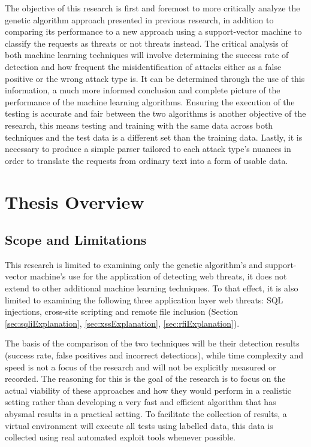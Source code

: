 The objective of this research is first and foremost to more critically analyze the genetic algorithm approach presented in previous research, in addition to comparing its performance to a new approach using a support-vector machine to classify the requests as threats or not threats instead.  The critical analysis of both machine learning techniques will involve determining the success rate of detection and how frequent the misidentification of attacks either as a false positive or the wrong attack type is.  It can be determined through the use of this information, a much more informed conclusion and complete picture of the performance of the machine learning algorithms.  Ensuring the execution of the testing is accurate and fair between the two algorithms is another objective of the research, this means testing and training with the same data across both techniques and the test data is a different set than the training data.  Lastly, it is necessary to produce a simple parser tailored to each attack type's nuances in order to translate the requests from ordinary text into a form of usable data.

\section{Thesis Overview}
\subsection{Scope and Limitations}\label{sec:scope}
This research is limited to examining only the genetic algorithm’s and support-vector machine’s use for the application of detecting web threats, it does not extend to other additional machine learning techniques.  To that effect, it is also limited to examining the following three application layer web threats: SQL injections, cross-site scripting and remote file inclusion (Section \ref{sec:sqliExplanation}, \ref{sec:xssExplanation}, \ref{sec:rfiExplanation}).

The basis of the comparison of the two techniques will be their detection results (success rate, false positives and incorrect detections), while time complexity and speed is not a focus of the research and will not be explicitly measured or recorded.  The reasoning for this is the goal of the research is to focus on the actual viability of these approaches and how they would perform in a realistic setting rather than developing a very fast and efficient algorithm that has abysmal results in a practical setting.  To facilitate the collection of results, a virtual environment will execute all tests using labelled data, this data is collected using real automated exploit tools whenever possible.
